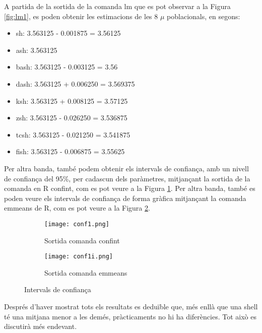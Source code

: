\documentclass[12pt]{article}
\begin{document}
A partida de la sortida de la comanda lm que es pot observar a la Figura \ref{fig:lm1}, es poden obtenir les estimacions
de les 8 $\mu$ poblacionals, en segons:
\begin{itemize}
  \item sh: 3.563125 - 0.001875 = 3.56125
  \item ash: 3.563125
  \item bash: 3.563125 - 0.003125 = 3.56
  \item dash: 3.563125 + 0.006250 = 3.569375
  \item ksh: 3.563125 + 0.008125 = 3.57125
  \item zsh: 3.563125 - 0.026250 = 3.536875
  \item tcsh: 3.563125 - 0.021250 = 3.541875
  \item fish: 3.563125 - 0.006875 = 3.55625 
\end{itemize}
\hfill \break
Per altra banda, també podem obtenir els intervals de confiança, amb un nivell de confiança del 95\%, per cadascun dels paràmetres,
mitjançant la sortida de la comanda en R confint, com es pot veure a la Figura \ref{fig:conf1}. Per altra banda, també es poden veure
els intervals de confiança de forma gràfica mitjançant la comanda emmeans de R, com es pot veure a la Figura \ref{fig:conf1i}.
\begin{figure}[h!]
  \centering
  \begin{subfigure}[b]{0.45\linewidth}
      \texttt{[image: conf1.png]}
      \caption{Sortida comanda confint}
      \label{fig:conf1}
  \end{subfigure}
  \begin{subfigure}[b]{0.45\linewidth}
    \texttt{[image: conf1i.png]}
    \caption{Sortida comanda emmeans}
    \label{fig:conf1i}
  \end{subfigure}
  \caption{Intervals de confiança}
  \label{fig:ic1}
\end{figure}

Després d'haver mostrat tots els resultats es deduïble que, més enllà que una shell té una mitjana menor a les demés,
pràcticaments no hi ha diferències. Tot això es discutirà més endevant.
\end{document}
